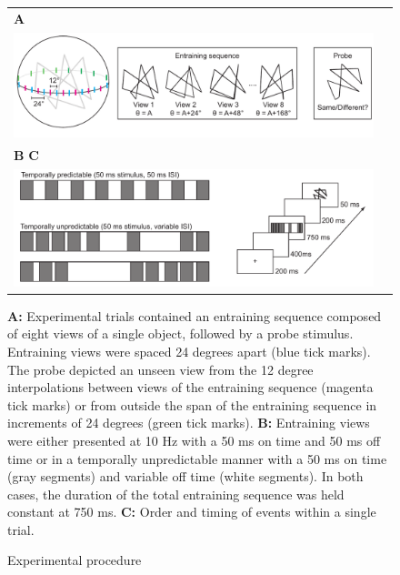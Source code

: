 \documentclass[dwyatte_dissertation.tex]{subfiles}
\begin{document}
\begin{figure}[h!]
\begin{center}
\begin{tabular}{ll}
\textbf{A} \\
\includegraphics[width=160mm]{figs/pleast/paperclip_task.pdf} \\
\textbf{B} \hspace{90mm} \textbf{C} \\
\includegraphics[width=160mm]{figs/pleast/paperclip_ISI.pdf} \\
\end{tabular}
\end{center}
\caption{Experimental procedure}{\textbf{A:} Experimental trials contained an entraining sequence composed of eight views of a single object, followed by a probe stimulus. Entraining views were spaced 24 degrees apart (blue tick marks). The probe depicted an unseen view from the 12 degree interpolations between views of the entraining sequence (magenta tick marks) or from outside the span of the entraining sequence in increments of 24 degrees (green tick marks). \textbf{B:} Entraining views were either presented at 10 Hz with a 50 ms on time and 50 ms off time or in a temporally unpredictable manner with a 50 ms on time (gray segments) and variable off time (white segments). In both cases, the duration of the total entraining sequence was held constant at 750 ms. \textbf{C:} Order and timing  of events within a single trial.}
\label{fig:task}
\end{figure}
\end{document}
